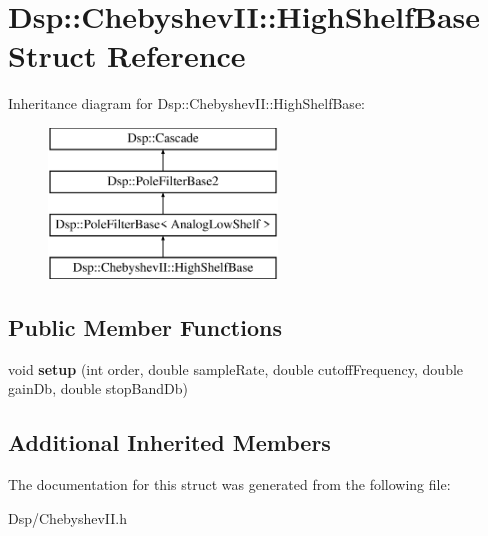 \hypertarget{structDsp_1_1ChebyshevII_1_1HighShelfBase}{\section{Dsp\-:\-:Chebyshev\-I\-I\-:\-:High\-Shelf\-Base Struct Reference}
\label{structDsp_1_1ChebyshevII_1_1HighShelfBase}
}
Inheritance diagram for Dsp\-:\-:Chebyshev\-I\-I\-:\-:High\-Shelf\-Base\-:\begin{figure}[H]
\begin{center}
\leavevmode
\includegraphics[height=4.000000cm]{structDsp_1_1ChebyshevII_1_1HighShelfBase}
\end{center}
\end{figure}
\subsection*{Public Member Functions}
\begin{DoxyCompactItemize}
\item 
\hypertarget{structDsp_1_1ChebyshevII_1_1HighShelfBase_adbbe377925bfc2736d09380cca93d371}{void {\bfseries setup} (int order, double sample\-Rate, double cutoff\-Frequency, double gain\-Db, double stop\-Band\-Db)}\label{structDsp_1_1ChebyshevII_1_1HighShelfBase_adbbe377925bfc2736d09380cca93d371}

\end{DoxyCompactItemize}
\subsection*{Additional Inherited Members}


The documentation for this struct was generated from the following file\-:\begin{DoxyCompactItemize}
\item 
Dsp/Chebyshev\-I\-I.\-h\end{DoxyCompactItemize}
